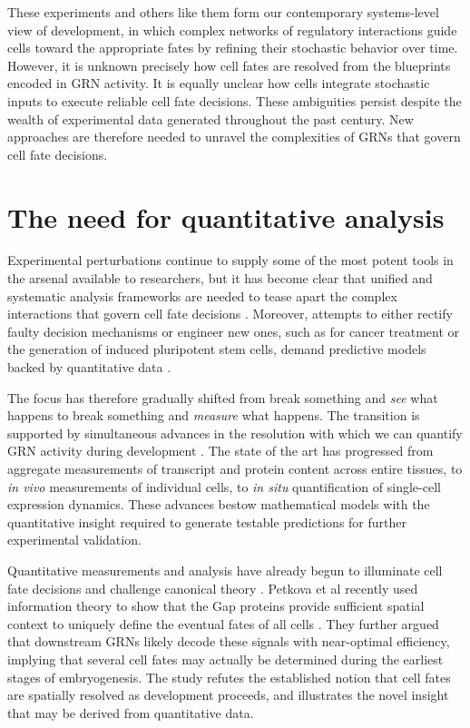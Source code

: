 These experiments and others like them form our contemporary systems-level view of development, in which complex networks of regulatory interactions guide cells toward the appropriate fates by refining their stochastic behavior over time. However, it is unknown precisely how cell fates are resolved from the blueprints encoded in GRN activity. It is equally unclear how cells integrate stochastic inputs to execute reliable cell fate decisions. These ambiguities persist despite the wealth of experimental data generated throughout the past century. New approaches are therefore needed to unravel the complexities of GRNs that govern cell fate decisions.

\section{The need for quantitative analysis}

Experimental perturbations continue to supply some of the most potent tools in the arsenal available to researchers, but it has become clear that unified and systematic analysis frameworks are needed to tease apart the complex interactions that govern cell fate decisions \cite{Lazebnik2004,Oates2009}. Moreover, attempts to either rectify faulty decision mechanisms or engineer new ones, such as for cancer treatment or the generation of induced pluripotent stem cells, demand predictive models backed by quantitative data \cite{Hornberg2006}.

The focus has therefore gradually shifted from break something and \textit{see} what happens to break something and \textit{measure} what happens. The transition is supported by simultaneous advances in the resolution with which we can quantify GRN activity during development \cite{Sbalzarini2016}. The state of the art has progressed from aggregate measurements of transcript and protein content across entire tissues, to \emph{in vivo} measurements of individual cells, to \emph{in situ} quantification of single-cell expression dynamics. These advances bestow mathematical models with the quantitative insight required to generate testable predictions for further experimental validation.

Quantitative measurements and analysis have already begun to illuminate cell fate decisions and challenge canonical theory \cite{Frick2017,Petkova2019,Wolff2018}. Petkova et al recently used information theory to show that the Gap proteins provide sufficient spatial context to uniquely define the eventual fates of all cells \cite{Petkova2019}. They further argued that downstream GRNs likely decode these signals with near-optimal efficiency, implying that several cell fates may actually be determined during the earliest stages of embryogenesis. The study refutes the established notion that cell fates are spatially resolved as development proceeds, and illustrates the novel insight that may be derived from quantitative data.

